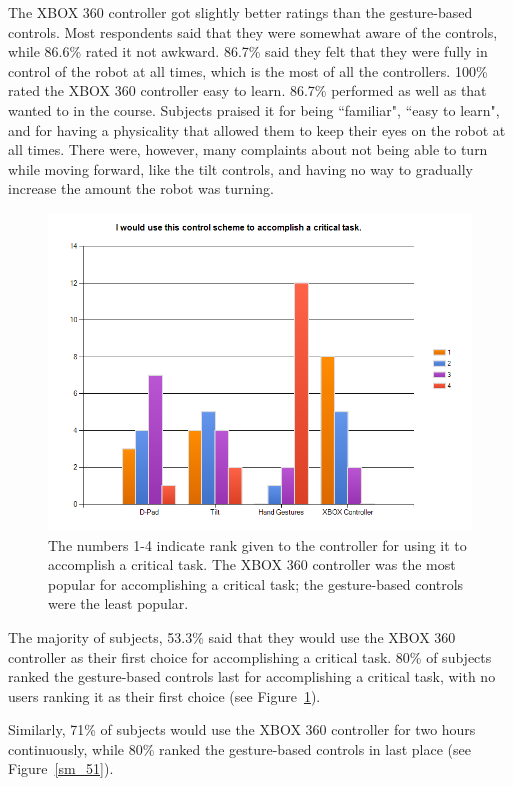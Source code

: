 \documentclass[12pt, letterpaper]{report}
\begin{document}
The XBOX 360 controller got slightly better ratings than the gesture-based controls. Most respondents said that they were somewhat aware of the controls, while 86.6\% rated it not awkward. 86.7\% said they felt that they were fully in control of the robot at all times, which is the most of all the controllers. 100\% rated the XBOX 360 controller easy to learn. 86.7\% performed as well as that wanted to in the course. Subjects praised it for being ``familiar", ``easy to learn", and for having a physicality that allowed them to keep their eyes on the robot at all times. There were, however, many complaints about not being able to turn while moving forward, like the tilt controls, and having no way to gradually increase the amount the robot was turning. 

\begin{figure}[h!]
	\centering
	\includegraphics[width=4.5in]{images/sm_50.png}
	\caption{The numbers 1-4 indicate rank given to the controller for using it to accomplish a critical task. The XBOX 360 controller was the most popular for accomplishing a critical task; the gesture-based controls were the least popular.}
	\label{sm_50}
\end{figure}

The majority of subjects, 53.3\% said that they would use the XBOX 360 controller as their first choice for accomplishing a critical task. 80\% of subjects ranked the gesture-based controls last for accomplishing a critical task, with no users ranking it as their first choice (see Figure~\ref{sm_50}).

Similarly, 71\% of subjects would use the XBOX 360 controller for two hours continuously, while 80\% ranked the gesture-based controls in last place (see Figure~\ref{sm_51}).
\end{document}
